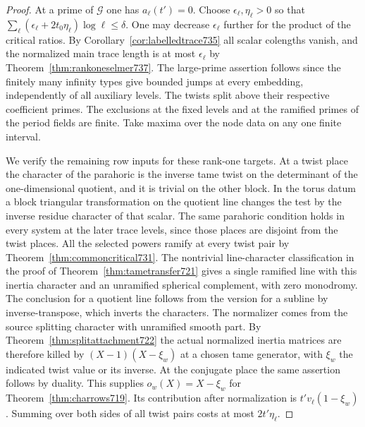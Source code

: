 \documentclass[a4paper,11pt]{article}
\theoremstyle{definition}
\theoremstyle{remark}
\numberwithin{equation}{section}
\begin{document}
\begin{proof}
At a prime of \(\mathcal G\) one has \(a_\ell(t')=0\). Choose
\(\epsilon_\ell,\eta_\ell>0\) so that
\(\sum_\ell(\epsilon_\ell+2t_0\eta_\ell)\log\ell\le\delta\).
One may decrease \(\epsilon_\ell\) further for the product of the
critical ratios. By Corollary~\ref{cor:labelledtrace735} all
scalar colengths vanish, and the normalized main trace length
is at most \(\epsilon_\ell\) by Theorem~\ref{thm:rankoneselmer737}.
The large-prime assertion follows since the finitely many infinity
types give bounded jumps at every embedding, independently of all
auxiliary levels. The twists split above their respective
coefficient primes. The exclusions at the fixed levels and at the
ramified primes of the period fields are finite. Take maxima over
the node data on any one finite interval.

We verify the remaining row inputs for these rank-one targets.
At a twist place the character of the parahoric is the inverse
tame twist on the determinant of the one-dimensional quotient,
and it is trivial on the other block. In the torus datum a block
triangular transformation on the quotient line changes the
test by the inverse residue character of that scalar. The same
parahoric condition holds in every system at the later trace
levels, since those places are disjoint from the twist places.
All the selected powers ramify at every twist pair by
Theorem~\ref{thm:commoncritical731}. The nontrivial
line-character classification in the proof of
Theorem~\ref{thm:tametransfer721} gives a single ramified line
with this inertia character and an unramified spherical complement,
with zero monodromy. The conclusion for a quotient line follows
from the version for a subline by inverse-transpose, which inverts
the characters. The normalizer comes from the source splitting
character with unramified smooth part. By
Theorem~\ref{thm:splitattachment722} the actual normalized
inertia matrices are therefore killed by
\((X-1)(X-\xi_w)\) at a chosen tame generator, with
\(\xi_w\) the indicated twist value or its inverse.
At the conjugate place the same assertion follows by duality.
This supplies \(o_w(X)=X-\xi_w\) for
Theorem~\ref{thm:charrows719}. Its contribution after normalization
is \(t'v_\ell(1-\xi_w)\). Summing over both sides of all twist
pairs costs at most \(2t'\eta_\ell\).


\end{proof}
\end{document}
